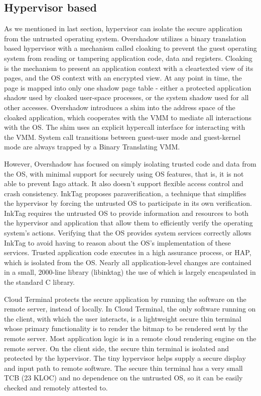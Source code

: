\subsection{Hypervisor based}

As we mentioned in last section, hypervisor can isolate the secure application
from the untrusted operating system. Overshadow \cite{Overshadow} utilizes a
binary translation based hypervisor with a mechanism called cloaking to prevent
the guest operating system from reading or tampering application code, data and
registers.  Cloaking is the mechanism to present an application context with a
cleartexted view of its pages, and the OS context with an encrypted view. At any
point in time, the page is mapped into only one shadow page table - either a
protected application shadow used by cloaked user-space processes, or the system
shadow used for all other accesses. Overshadow introduces a shim into the
address space of the cloaked application, which cooperates with the VMM to
mediate all interactions with the OS. The shim uses an explicit hypercall
interface for interacting with the VMM. System call transitions between
guest-user mode and guest-kernel mode are always trapped by a Binary Translating
VMM.

However, Overshadow has focused on simply isolating trusted code and data from
the OS, with minimal support for securely using OS features, that is, it is not
able to prevent Iago attack. It also doesn't support flexible access control and
crash consistency. InkTag proposes paraverification, a technique that simplifies
the hypervisor by forcing the untrusted OS to participate in its own
verification. InkTag requires the untrusted OS to provide information and
resources to both the hypervisor and application that allow them to efficiently
verify the operating system's actions. Verifying that the OS provides system
services correctly allows InkTag to avoid having to reason about the OS's
implementation of these services. Trusted application code executes in a high
assurance process, or HAP, which is isolated from the OS. Nearly all
application-level changes are contained in a small, 2000-line library
(libinktag) the use of which is largely encapsulated in the standard C library.

Cloud Terminal \cite{CloudTerminal} protects the secure application by running
the software on the remote server, instead of locally. In Cloud Terminal, the
only software running on the client, with which the user interacts, is a
lightweight secure thin terminal whose primary functionality is to render the
bitmap to be rendered sent by the remote server. Most application logic is in a
remote cloud rendering engine on the remote server. On the client side, the
secure thin terminal is isolated and protected by the hypervisor. The tiny
hypervisor helps supply a secure display and input path to remote software. The
secure thin terminal has a very small TCB (23 KLOC) and no dependence on the
untrusted OS, so it can be easily checked and remotely attested to.


